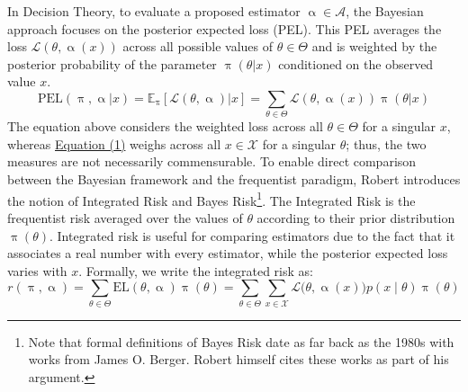 \documentclass[letterpaper,12pt]{article}
\newcommand{\given}{|}
\begin{document}
In Decision Theory, to evaluate a proposed estimator $\upalpha \in \mathcal{A}$, the Bayesian approach focuses on the posterior expected loss (PEL). This PEL averages the loss $\mathcal{L}(\theta, \upalpha(x))$ across all possible values of $\theta \in \Theta$ and is weighted by the posterior probability of the parameter $\uppi(\theta \given x)$ conditioned on the observed value $x$. 
\begin{equation}
		\text{PEL}(\uppi, \upalpha \given x) = \mathbb{E}_{\uppi}[\mathcal{L}(\theta, \upalpha)\given x] = \sum_{\theta \in \Theta} \mathcal{L}(\theta, \upalpha(x)) \uppi(\theta \given x)
\end{equation}
The equation above considers the weighted loss across all $\theta \in \Theta$ for a singular $x$, whereas \hyperref[eq:EL]{Equation (1)} weighs across all $x \in \mathcal{X}$ for a singular $\theta$; thus, the two measures are not necessarily commensurable. To enable direct comparison between the Bayesian framework and the frequentist paradigm, Robert introduces the notion of Integrated Risk and Bayes Risk\footnote{Note that formal definitions of Bayes Risk date as far back as the 1980s with works from James O. Berger\cite{berger1985}. Robert himself cites these works as part of his argument.}. The Integrated Risk is the frequentist risk averaged over the values of $\theta$ according to their prior distribution $\uppi(\theta)$. Integrated risk is useful for comparing estimators due to the fact that it associates a real number with every estimator, while the posterior expected loss varies with $x$. Formally, we write the integrated risk as:
\begin{equation}
 {r}(\uppi, \upalpha) = \sum_{\theta \in \Theta} \text{EL}(\theta, \upalpha)  \uppi(\theta) = \sum_{\theta \in \Theta}\sum_{x \in \mathcal{X}} \mathcal{L}\big(\theta, \upalpha(x) \big)p(x \mid \theta) \uppi(\theta)  \label{eq:IR}
\end{equation}
\end{document}
